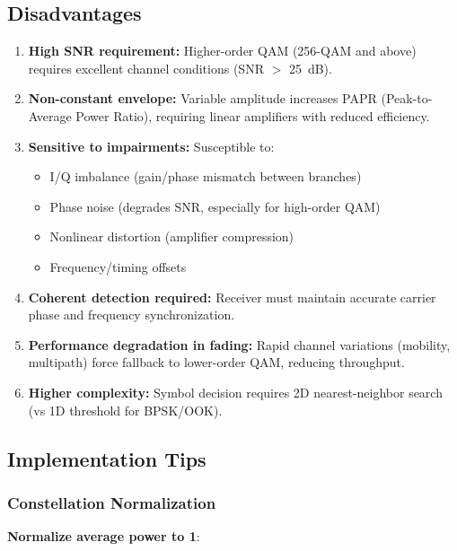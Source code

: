 \subsection*{Disadvantages}

\begin{enumerate}
\item \textbf{High SNR requirement:} Higher-order QAM (256-QAM and above) requires excellent channel conditions (SNR $>$ 25~dB).

\item \textbf{Non-constant envelope:} Variable amplitude increases PAPR (Peak-to-Average Power Ratio), requiring linear amplifiers with reduced efficiency.

\item \textbf{Sensitive to impairments:} Susceptible to:
  \begin{itemize}
  \item I/Q imbalance (gain/phase mismatch between branches)
  \item Phase noise (degrades SNR, especially for high-order QAM)
  \item Nonlinear distortion (amplifier compression)
  \item Frequency/timing offsets
  \end{itemize}

\item \textbf{Coherent detection required:} Receiver must maintain accurate carrier phase and frequency synchronization.

\item \textbf{Performance degradation in fading:} Rapid channel variations (mobility, multipath) force fallback to lower-order QAM, reducing throughput.

\item \textbf{Higher complexity:} Symbol decision requires 2D nearest-neighbor search (vs 1D threshold for BPSK/OOK).
\end{enumerate}

\subsection{Implementation Tips}

\subsubsection{Constellation
Normalization}\label{constellation-normalization}

\textbf{Normalize average power to 1}:

